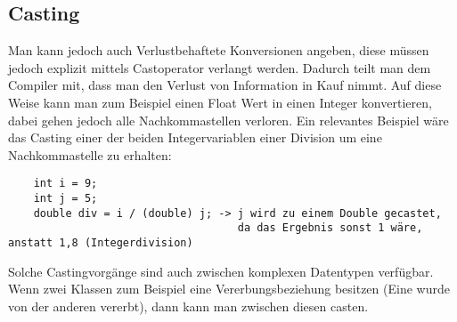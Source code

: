 \documentclass{article}
\begin{document}
	\subsection{Casting}
	Man kann jedoch auch Verlustbehaftete Konversionen angeben, diese müssen jedoch explizit mittels Castoperator verlangt werden. Dadurch teilt man dem Compiler mit, dass man den Verlust von Information in Kauf nimmt. Auf diese Weise kann man zum Beispiel einen Float Wert in einen Integer konvertieren, dabei gehen jedoch alle Nachkommastellen verloren. Ein relevantes Beispiel wäre das Casting einer der beiden Integervariablen einer Division um eine Nachkommastelle zu erhalten:
	\begin{verbatim}
	int i = 9;
	int j = 5;
	double div = i / (double) j; -> j wird zu einem Double gecastet, 
	                                da das Ergebnis sonst 1 wäre, anstatt 1,8 (Integerdivision)
	\end{verbatim}
	Solche Castingvorgänge sind auch zwischen komplexen Datentypen verfügbar. Wenn zwei Klassen zum Beispiel eine Vererbungsbeziehung besitzen (Eine wurde von der anderen vererbt), dann kann man zwischen diesen casten.
\end{document}
